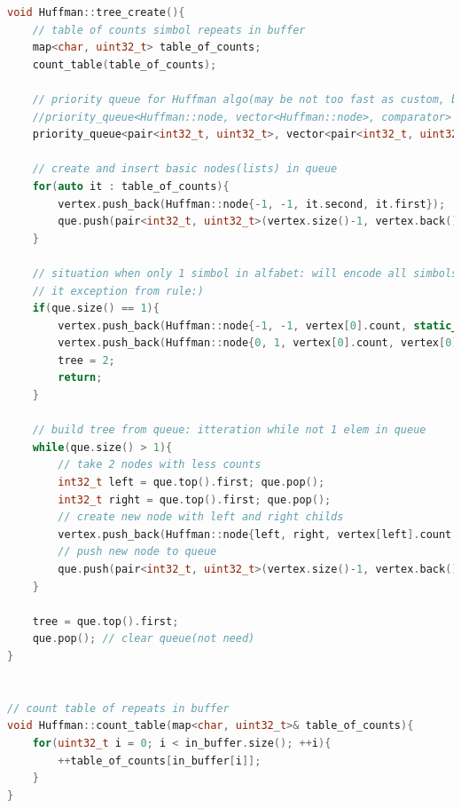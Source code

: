 \begin{lstlisting}[language=C++]
void Huffman::tree_create(){
    // table of counts simbol repeats in buffer
    map<char, uint32_t> table_of_counts;
    count_table(table_of_counts);

    // priority queue for Huffman algo(may be not too fast as custom, but create custom lazy)
    //priority_queue<Huffman::node, vector<Huffman::node>, comparator> que;
    priority_queue<pair<int32_t, uint32_t>, vector<pair<int32_t, uint32_t>>, comparator> que;

    // create and insert basic nodes(lists) in queue
    for(auto it : table_of_counts){
        vertex.push_back(Huffman::node{-1, -1, it.second, it.first});
        que.push(pair<int32_t, uint32_t>(vertex.size()-1, vertex.back().count));
    }

    // situation when only 1 simbol in alfabet: will encode all simbols as 0
    // it exception from rule:)
    if(que.size() == 1){
        vertex.push_back(Huffman::node{-1, -1, vertex[0].count, static_cast<char>(vertex[0].value+1)});
        vertex.push_back(Huffman::node{0, 1, vertex[0].count, vertex[0].value});
        tree = 2;
        return;
    }

    // build tree from queue: itteration while not 1 elem in queue
    while(que.size() > 1){
        // take 2 nodes with less counts
        int32_t left = que.top().first; que.pop();
        int32_t right = que.top().first; que.pop();
        // create new node with left and right childs
        vertex.push_back(Huffman::node{left, right, vertex[left].count + vertex[right].count, vertex[left].value});
        // push new node to queue
        que.push(pair<int32_t, uint32_t>(vertex.size()-1, vertex.back().count));
    }
    
    tree = que.top().first;
    que.pop(); // clear queue(not need)
}


// count table of repeats in buffer
void Huffman::count_table(map<char, uint32_t>& table_of_counts){
    for(uint32_t i = 0; i < in_buffer.size(); ++i){
        ++table_of_counts[in_buffer[i]];
    }
}
\end{lstlisting}

